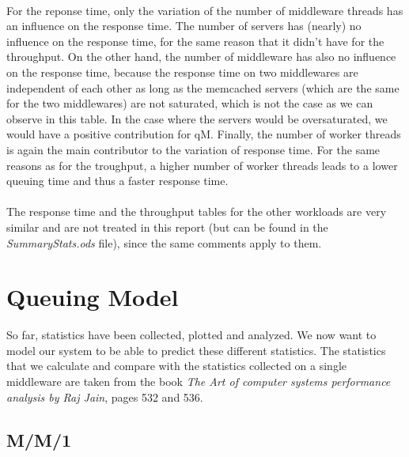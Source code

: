 \documentclass[11pt,a4paper]{article}
\begin{document}
\\
For the reponse time, only the variation of the number of middleware threads has an influence on the response time. The number of servers has (nearly) no influence on the response time, for the same reason that it didn't have for the throughput. On the other hand, the number of middleware has also no influence on the response time, because the response time on two middlewares are independent of each other as long as the memcached servers (which are the same for the two middlewares) are not saturated, which is not the case as we can observe in this table. In the case where the servers would be oversaturated, we would have a positive contribution for qM. 
Finally, the number of worker threads is again the main contributor to the variation of response time. For the same reasons as for the troughput, a higher number of worker threads leads to a lower queuing time and thus a faster response time. 
\\\\
The response time and the throughput tables for the other workloads are very similar and are not treated in this report (but can be found in the \textit{SummaryStats.ods} file), since the same comments apply to them. 
\newpage
\section{Queuing Model}
So far, statistics have been collected, plotted and analyzed. We now want to model our system to be able to predict these different statistics. The statistics that we calculate and compare with the statistics collected on a single middleware are taken from the book \textit{The Art of computer systems performance analysis by Raj Jain}, pages 532 and 536. 

\subsection{M/M/1}
\end{document}
